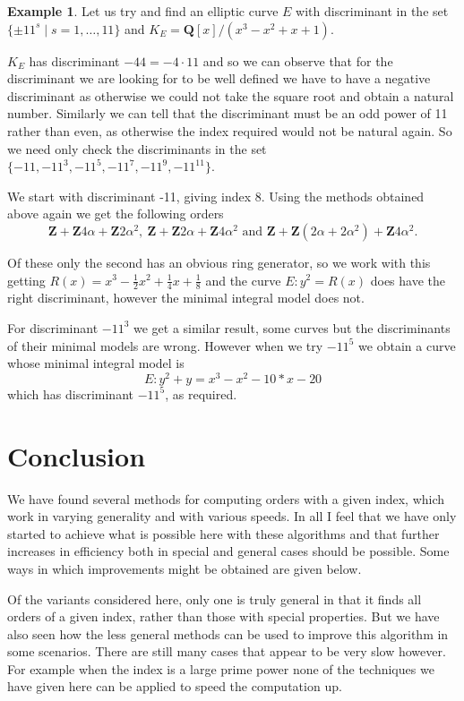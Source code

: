 \documentclass[12pt,a4paper,abstracton,bibtotoc]{scrreprt}
\theoremstyle{definition}
\newtheorem{ex}{Example}
\newcommand{\QQ}{\mathbf{Q}}
\newcommand{\ZZ}{\mathbf{Z}}
\begin{document}
\begin{ex}
Let us try and find an elliptic curve $E$ with discriminant in the set $\{\pm 11^s\mid s = 1,\ldots,11\}$ and $K_E = \QQ[x]/(x^3 - x^2 + x + 1)$.

$K_E$ has discriminant $-44 = -4\cdot 11$ and so we can observe that for the discriminant we are looking for to be well defined we have to have a negative discriminant as otherwise we could not take the square root and obtain a natural number.
Similarly we can tell that the discriminant must be an odd power of 11 rather than even, as otherwise the index required would not be natural again.
So we need only check the discriminants in the set $\{-11,-11^3,-11^5,-11^7,-11^9,-11^11\}$.

We start with discriminant -11, giving index 8.
Using the methods obtained above again we get the following orders
\[
\ZZ + \ZZ4\alpha + \ZZ2\alpha^2,\ \ZZ + \ZZ2\alpha + \ZZ4\alpha^2\text{ and } \ZZ + \ZZ(2\alpha + 2\alpha^2) + \ZZ4\alpha^2.
\]

Of these only the second has an obvious ring generator, so we work with this getting $R(x) = x^3 -\frac{1}{2}x^2 + \frac{1}{4}x + \frac{1}{8}$ and the curve $E\colon y^2 = R(x)$ does have the right discriminant, however the minimal integral model does not.

For discriminant $-11^3$ we get a similar result, some curves but the discriminants of their minimal models are wrong.
However when we try $-11^5$ we obtain a curve whose minimal integral model is
\[
E\colon y^2 + y = x^3 - x^2 - 10*x - 20
\]
which has discriminant $-11^5$, as required.
\end{ex}

\chapter{Conclusion}
We have found several methods for computing orders with a given index, which work in varying generality and with various speeds.
In all I feel that we have only started to achieve what is possible here with these algorithms and that further increases in efficiency both in special and general cases should be possible.
Some ways in which improvements might be obtained are given below.

Of the variants considered here, only one is truly general in that it finds all orders of a given index, rather than those with special properties.
But we have also seen how the less general methods can be used to improve this algorithm in some scenarios.
There are still many cases that appear to be very slow however.
For example when the index is a large prime power none of the techniques we have given here can be applied to speed the computation up.
\end{document}
